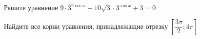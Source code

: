 \begin{ex}
	\begin{condition}
		\begin{enumcols}[label=\asbuk*)]
			\item Решите уравнение \( 9\cdot3^{2\cos x } - 10\sqrt{3}\cdot3^{\cos x} + 3 = 0 \)
			\item Найдите все корни уравнения, принадлежащие отрезку \( \left[\dfrac{3\pi}{2};4\pi\right] \)
		\end{enumcols}
	\end{condition}
\end{ex}
